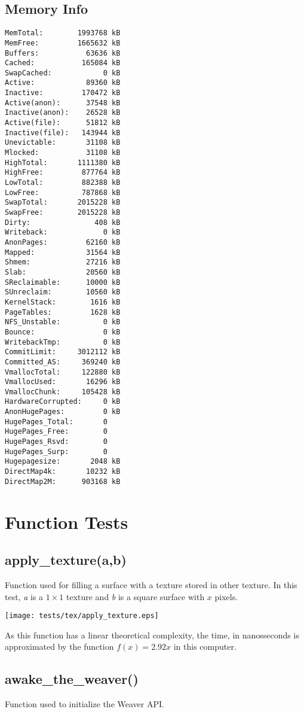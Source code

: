 \documentclass{article}
\begin{document}
\subsection{Memory Info}
\begin{verbatim}
MemTotal:        1993768 kB
MemFree:         1665632 kB
Buffers:           63636 kB
Cached:           165084 kB
SwapCached:            0 kB
Active:            89360 kB
Inactive:         170472 kB
Active(anon):      37548 kB
Inactive(anon):    26528 kB
Active(file):      51812 kB
Inactive(file):   143944 kB
Unevictable:       31108 kB
Mlocked:           31108 kB
HighTotal:       1111380 kB
HighFree:         877764 kB
LowTotal:         882388 kB
LowFree:          787868 kB
SwapTotal:       2015228 kB
SwapFree:        2015228 kB
Dirty:               408 kB
Writeback:             0 kB
AnonPages:         62160 kB
Mapped:            31564 kB
Shmem:             27216 kB
Slab:              20560 kB
SReclaimable:      10000 kB
SUnreclaim:        10560 kB
KernelStack:        1616 kB
PageTables:         1628 kB
NFS_Unstable:          0 kB
Bounce:                0 kB
WritebackTmp:          0 kB
CommitLimit:     3012112 kB
Committed_AS:     369240 kB
VmallocTotal:     122880 kB
VmallocUsed:       16296 kB
VmallocChunk:     105428 kB
HardwareCorrupted:     0 kB
AnonHugePages:         0 kB
HugePages_Total:       0
HugePages_Free:        0
HugePages_Rsvd:        0
HugePages_Surp:        0
Hugepagesize:       2048 kB
DirectMap4k:       10232 kB
DirectMap2M:      903168 kB
\end{verbatim}
\section{Function Tests}
\subsection{apply\_texture(a,b)}
Function used for filling a surface with a texture
stored in other texture.
In this test, \emph{a} is a $1\times1$ texture
and \emph{b} is a square surface with $x$ pixels.

\texttt{[image: tests/tex/apply\_texture.eps]}

As this function has a linear theoretical
complexity, the time, in nanosseconds is 
approximated by the function $f(x)=2.92x$
in this computer.
\subsection{awake\_the\_weaver()}
Function used to initialize the Weaver API.
\end{document}
